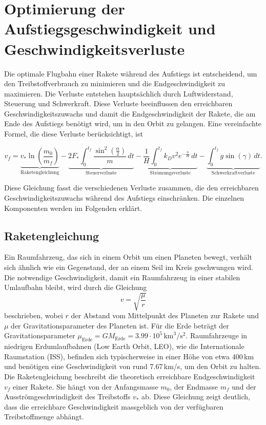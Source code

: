 %
%
%
%

\section{Optimierung der Aufstiegsgeschwindigkeit und Geschwindigkeitsverluste \label{leo:section:aufstiegsgleichung}}

Die optimale Flugbahn einer Rakete während des Aufstiegs ist entscheidend, um den Treibstoffverbrauch zu minimieren und die Endgeschwindigkeit zu maximieren. 
Die Verluste entstehen hauptsächlich durch Luftwiderstand, Steuerung und Schwerkraft. 
Diese Verluste beeinflussen den erreichbaren Geschwindigkeitszuwachs und damit die Endgeschwindigkeit der Rakete, die am Ende des Aufstiegs benötigt wird, um in den Orbit zu gelangen. 
Eine vereinfachte Formel, die diese Verluste berücksichtigt, ist

\begin{equation}
	v_f = \underbrace{v_* \ln \left(\frac{m_0}{m_f}\right)}_{\text{Raketengleichung}} 
	- \underbrace{2F_* \int_0^{t_f} \frac{\sin^2\left(\frac{\alpha}{2}\right)}{m} \, dt }_{\text{Steuerverluste}}
	- \underbrace{\frac{1}{H} \int_0^{t_f} k_Dv^2 e^{-\frac{h}{H}} \, dt }_{\text{Strömungsverluste}}
	- \underbrace{\int_0^{t_f} g \sin \left(\gamma\right) \, dt}_{\text{Schwerkraftverluste}}.
	\label{leo:aufstiegsgleichung}
\end{equation}

Diese Gleichung fasst die verschiedenen Verluste zusammen, die den erreichbaren Geschwindigkeitszuwachs während des Aufstiegs einschränken. 
Die einzelnen Komponenten werden im Folgenden erklärt.

\subsection{Raketengleichung \label{leo:section:raketengleichung}}
Ein Raumfahrzeug, das sich in einem Orbit um einen Planeten bewegt, verhält sich ähnlich wie ein Gegenstand, der an einem Seil im Kreis geschwungen wird. 
Die notwendige Geschwindigkeit, damit ein Raumfahrzeug in einer stabilen Umlaufbahn bleibt, wird durch die Gleichung
\[
v = \sqrt{\frac{\mu}{r}}
\]
beschrieben, wobei \(r\) der Abstand vom Mittelpunkt des Planeten zur Rakete und \(\mu\) der Gravitationsparameter des Planeten ist.
Für die Erde beträgt der Gravitationsparameter $\mu_{\text{Erde}} = GM_{\text{Erde}} = 3.99 \cdot 10^5\,\text{km}^3/\text{s}^2$. 
Raumfahrzeuge in niedrigen Erdumlaufbahnen (Low Earth Orbit, LEO), wie die Internationale Raumstation (ISS), befinden sich typischerweise in einer Höhe von etwa 400\,km und benötigen eine Geschwindigkeit von rund 7.67\,km/s, um den Orbit zu halten.
Die Raketengleichung beschreibt die theoretisch erreichbare Endgeschwindigkeit \(v_f\) einer Rakete. 
Sie hängt von der Anfangsmasse \(m_0\), der Endmasse \(m_f\) und der Ausströmgeschwindigkeit des Treibstoffs \(v_*\) ab. 
Diese Gleichung zeigt deutlich, dass die erreichbare Geschwindigkeit massgeblich von der verfügbaren Treibstoffmenge abhängt.

